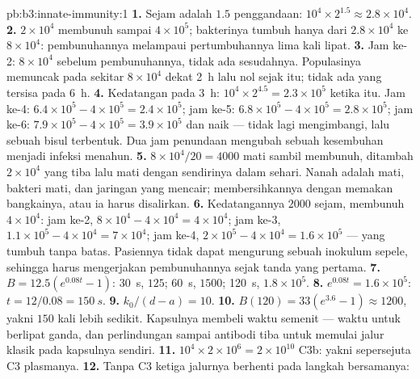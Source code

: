 \begin{solution}{pb:b3:innate-immunity:1}
\textbf{1.} Sejam adalah $1.5$ penggandaan: $10^{4}\times 2^{1.5} \approx
2.8\times 10^{4}$.
\textbf{2.} $2\times 10^{4}$  membunuh sampai $4\times 10^{5}$;
bakterinya tumbuh hanya dari $2.8\times 10^{4}$ ke $8\times 10^{4}$:
pembunuhannya melampaui pertumbuhannya lima kali lipat.
\textbf{3.} Jam ke-2: $8\times 10^{4}$ sebelum pembunuhannya, tidak ada sesudahnya.
Populasinya memuncak pada sekitar $8\times 10^{4}$ dekat \qty{2}{h} lalu nol
sejak itu; tidak ada yang tersisa pada \qty{6}{h}.
\textbf{4.} Kedatangan pada \qty{3}{h}: $10^{4}\times 2^{4.5} = 2.3\times
10^{5}$ ketika itu. Jam ke-4: $6.4\times 10^{5} - 4\times 10^{5} = 2.4\times
10^{5}$; jam ke-5: $6.8\times 10^{5} - 4\times 10^{5} = 2.8\times 10^{5}$;
jam ke-6: $7.9\times 10^{5} - 4\times 10^{5} = 3.9\times 10^{5}$ dan
naik ---  tidak lagi mengimbangi, lalu sebuah bisul terbentuk. Dua
jam penundaan mengubah sebuah kesembuhan menjadi infeksi menahun.
\textbf{5.} $8\times 10^{4}/20 = 4000$  mati sambil membunuh, ditambah
$2\times 10^{4}$ yang tiba lalu mati dengan sendirinya dalam sehari. Nanah adalah
 mati, bakteri mati, dan jaringan yang mencair;  membersihkannya
dengan memakan bangkainya, atau ia harus disalirkan.
\textbf{6.} Kedatangannya $2000$ sejam, membunuh $4\times 10^{4}$: jam ke-2,
$8\times 10^{4} - 4\times 10^{4} = 4\times 10^{4}$; jam ke-3, $1.1\times
10^{5} - 4\times 10^{4} = 7\times 10^{4}$; jam ke-4, $2\times 10^{5} -
4\times 10^{4} = 1.6\times 10^{5}$ --- yang tumbuh tanpa batas. Pasiennya
tidak dapat mengurung sebuah inokulum sepele, sehingga  harus mengerjakan
pembunuhannya sejak tanda yang pertama.
\textbf{7.} $B = 12.5(e^{0.08t} - 1)$: \qty{30}{s}, $125$; \qty{60}{s},
$1500$; \qty{120}{s}, $1.8\times 10^{5}$.
\textbf{8.} $e^{0.08t} = 1.6\times 10^{5}$: $t = 12/0.08 = \qty{150}{s}$.
\textbf{9.} $k_{0}/(d - a) = 10$.
\textbf{10.} $B(120) = 33(e^{3.6} - 1) \approx 1200$, yakni $150$ kali lebih sedikit.
Kapsulnya membeli waktu semenit --- waktu untuk berlipat ganda, dan perlindungan sampai
antibodi tiba untuk memulai jalur klasik pada kapsulnya
sendiri.
\textbf{11.} $10^{4}\times 2\times 10^{6} = 2\times 10^{10}$ C3b: yakni
sepersejuta C3 plasmanya.
\textbf{12.} Tanpa C3 ketiga jalurnya berhenti pada langkah bersamanya:

\end{solution}
